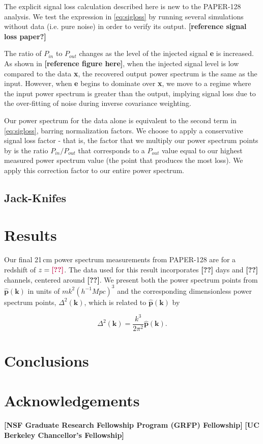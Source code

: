 \documentclass[preprint2,numberedappendix,tighten,twocolappendix]{aastex6}  %
\newcommand{\cc}[1]{{\color{purple} \textbf{[#1]}}}
\begin{document}
The explicit signal loss calculation described here is new to the PAPER-128 analysis. We test the expression in \eqref{eq:sigloss} by running several simulations without data (i.e. pure noise) in order to verify its output. \cc{reference signal loss paper?}

The ratio of $P_{in}$ to $P_{out}$ changes as the level of the injected signal \textbf{e} is increased. As shown in \cc{reference figure here}, when the injected signal level is low compared to the data \textbf{x}, the recovered output power spectrum is the same as the input. However, when \textbf{e} begins to dominate over  \textbf{x}, we move to a regime where the input power spectrum is greater than the output, implying signal loss due to the over-fitting of noise during inverse covariance weighting. 

Our power spectrum for the data alone is equivalent to the second term in \eqref{eq:sigloss}, barring normalization factors. We choose to apply a conservative signal loss factor - that is, the factor that we multiply our power spectrum points by is the ratio $P_{in}/P_{out}$ that corresponds to a $P_{out}$ value equal to our highest measured power spectrum value (the point that produces the most loss). We apply this correction factor to our entire power spectrum.

\subsection{Jack-Knifes}
\label{sec:jack}

\section{Results}
\label{sec:Res}

Our final 21\,cm power spectrum measurements from PAPER-128 are for a redshift of $z=\cc{??}$. The data used for this result incorporates \cc{??} days and \cc{??} channels, centered around \cc{??}. We present both the power spectrum points from $\hat{\textbf{p}}(\textbf{k})$ in units of $mk^{2}(h^{-1}Mpc)^{3}$ and the corresponding dimensionless power spectrum points, $\Delta^{2}(\textbf{k})$, which is related to $\hat{\textbf{p}}(\textbf{k})$ by

\begin{equation}
\label{eq:deltasq}
\Delta^{2}(\textbf{k}) = \frac{k^{3}}{2\pi^{2}}\hat{\textbf{p}}(\textbf{k}).
\end{equation}

\section{Conclusions}
\label{sec:Con}

\section{Acknowledgements}
\cc{NSF Graduate Research Fellowship Program (GRFP) Fellowship}
\cc{UC Berkeley Chancellor's Fellowship}
\label{sec:Ack}



\end{document}
